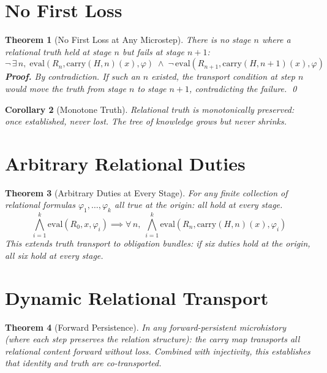 \documentclass[12pt,a4paper]{article}
\newtheorem{theorem}{Theorem}[section]
\newtheorem{corollary}[theorem]{Corollary}
\begin{document}
\section{No First Loss}

\begin{theorem}[No First Loss at Any Microstep]\label{thm:noloss}
There is no stage $n$ where a relational truth held at stage $n$ but fails
at stage $n+1$:
\[
\neg\, \exists\, n,\; \text{eval}(R_n, \text{carry}(H, n)(x), \varphi)
\;\wedge\; \neg\, \text{eval}(R_{n+1}, \text{carry}(H, n+1)(x), \varphi)
\]
\textbf{Proof.} By contradiction. If such an $n$ existed, the transport
condition at step $n$ would move the truth from stage $n$ to stage $n+1$,
contradicting the failure. \qed
\end{theorem}

\begin{corollary}[Monotone Truth]
Relational truth is monotonically preserved: once established, never lost.
The tree of knowledge grows but never shrinks.
\end{corollary}

\section{Arbitrary Relational Duties}

\begin{theorem}[Arbitrary Duties at Every Stage]\label{thm:duties}
For any finite collection of relational formulas $\varphi_1, \ldots, \varphi_k$
all true at the origin: all hold at every stage.
\[
\bigwedge_{i=1}^{k} \text{eval}(R_0, x, \varphi_i)
\implies
\forall\, n,\; \bigwedge_{i=1}^{k} \text{eval}(R_n, \text{carry}(H, n)(x), \varphi_i)
\]
This extends truth transport to obligation bundles: if six duties hold at
the origin, all six hold at every stage.
\end{theorem}

\section{Dynamic Relational Transport}

\begin{theorem}[Forward Persistence]\label{thm:forward}
In any forward-persistent microhistory (where each step preserves the
relation structure): the carry map transports all relational content
forward without loss. Combined with injectivity, this establishes
that identity and truth are co-transported.
\end{theorem}
\end{document}
